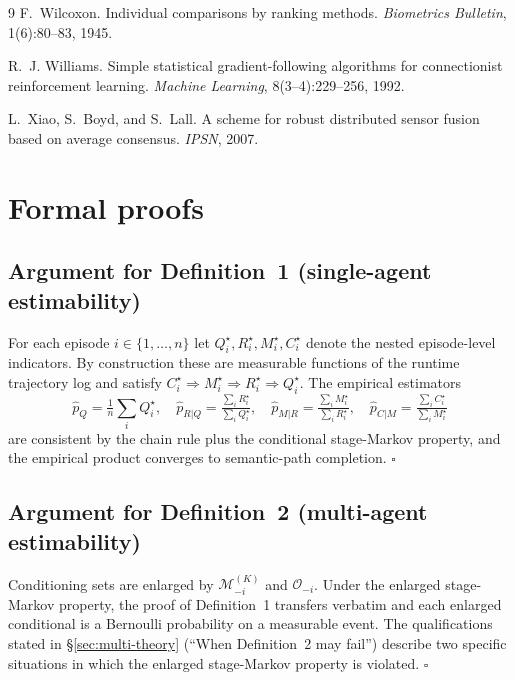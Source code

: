 \documentclass{article}
\begin{document}
{\begin{thebibliography}{9}
F.~Wilcoxon.
\newblock Individual comparisons by ranking methods.
\newblock \emph{Biometrics Bulletin}, 1(6):80--83, 1945.

R.~J. Williams.
\newblock Simple statistical gradient-following algorithms for connectionist reinforcement learning.
\newblock \emph{Machine Learning}, 8(3--4):229--256, 1992.

L.~Xiao, S.~Boyd, and S.~Lall.
\newblock A scheme for robust distributed sensor fusion based on average consensus.
\newblock \emph{IPSN}, 2007.

\end{thebibliography}
}

\appendix

\section{Formal proofs}
\label{app:proofs}

\subsection{Argument for Definition~1 (single-agent estimability)}

For each episode $i \in \{1,\dots,n\}$ let $Q_i^\star, R_i^\star, M_i^\star, C_i^\star$ denote the nested episode-level indicators. By construction these are measurable functions of the runtime trajectory log and satisfy $C_i^\star \Rightarrow M_i^\star \Rightarrow R_i^\star \Rightarrow Q_i^\star$. The empirical estimators
\[
\hat p_Q = \tfrac{1}{n}\sum_i Q_i^\star,\quad
\hat p_{R|Q} = \tfrac{\sum_i R_i^\star}{\sum_i Q_i^\star},\quad
\hat p_{M|R} = \tfrac{\sum_i M_i^\star}{\sum_i R_i^\star},\quad
\hat p_{C|M} = \tfrac{\sum_i C_i^\star}{\sum_i M_i^\star}
\]
are consistent by the chain rule plus the conditional stage-Markov property, and the empirical product converges to semantic-path completion. \hfill$\square$

\subsection{Argument for Definition~2 (multi-agent estimability)}

Conditioning sets are enlarged by $\mathcal{M}_{-i}^{(K)}$ and $\mathcal{O}_{-i}$. Under the enlarged stage-Markov property, the proof of Definition~1 transfers verbatim and each enlarged conditional is a Bernoulli probability on a measurable event. The qualifications stated in \S\ref{sec:multi-theory} (``When Definition~2 may fail'') describe two specific situations in which the enlarged stage-Markov property is violated. \hfill$\square$
\end{document}
